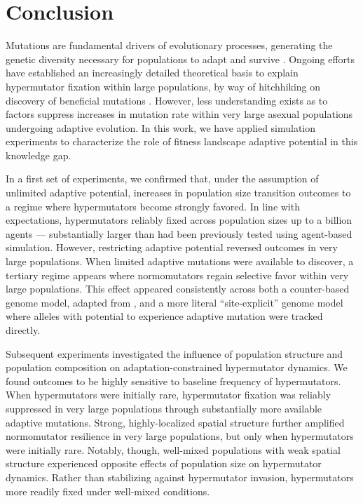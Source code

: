 \section{Conclusion} \label{sec:conclusion}

Mutations are fundamental drivers of evolutionary processes, generating the genetic diversity necessary for populations to adapt and survive \citep{hershberg2015mutation}.
Ongoing efforts have established an increasingly detailed theoretical basis to explain hypermutator fixation within large populations, by way of hitchhiking on discovery of beneficial mutations \citep{raynes2011mutator,raynes2013effect,raynes2018sign,raynes2019selection,raynes2019migration}.
However, less understanding exists as to factors suppress increases in mutation rate within very large asexual populations undergoing adaptive evolution.
In this work, we have applied simulation experiments to characterize the role of fitness landscape adaptive potential in this knowledge gap.

In a first set of experiments, we confirmed that, under the assumption of unlimited adaptive potential, increases in population size transition outcomes to a regime where hypermutators become strongly favored.
In line with expectations, hypermutators reliably fixed across population sizes up to a billion agents — substantially larger than had been previously tested using agent-based simulation.
However, restricting adaptive potential reversed outcomes in very large populations.
When limited adaptive mutations were available to discover, a tertiary regime appears where normomutators regain selective favor within very large populations.
This effect appeared consistently across both a counter-based genome model, adapted from \citet{raynes2018sign}, and a more literal ``site-explicit'' genome model where alleles with potential to experience adaptive mutation were tracked directly.

Subsequent experiments investigated the influence of population structure and population composition on adaptation-constrained hypermutator dynamics.
We found outcomes to be highly sensitive to baseline frequency of hypermutators.
When hypermutators were initially rare, hypermutator fixation was reliably suppressed in very large populations through substantially more available adaptive mutations.
Strong, highly-localized spatial structure further amplified normomutator resilience in very large populations, but only when hypermutators were initially rare.
Notably, though, well-mixed populations with weak spatial structure experienced opposite effects of population size on hypermutator dynamics.
Rather than stabilizing against hypermutator invasion, hypermutators more readily fixed under well-mixed conditions.

